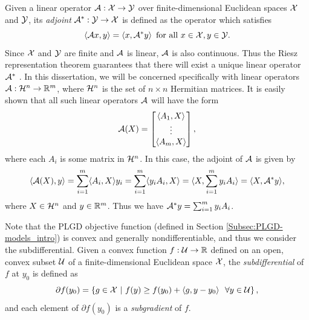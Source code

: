 Given a linear operator ${\mathcal A} : {\mathcal X} \rightarrow {\mathcal Y}$ over finite-dimensional Euclidean spaces ${\mathcal X}$ and ${\mathcal Y}$, its \textit{adjoint} ${\mathcal A}^* : {\mathcal Y} \rightarrow {\mathcal X}$ is defined as the operator which satisfies 
\begin{equation}			\label{Def:adjoint_operator}
\langle {\mathcal A} x, y \rangle = \langle x, {\mathcal A}^* y \rangle \hspace{5pt} \text{for all } x \in {\mathcal X}, y \in {\mathcal Y}. 
\end{equation} 
Since ${\mathcal X}$ and ${\mathcal Y}$ are finite and ${\mathcal A}$ is linear, ${\mathcal A}$ is also continuous.  Thus the Riesz representation theorem guarantees that there will exist a unique linear operator ${\mathcal A}^*$ \cite[Section 6.2]{reed1980functional}.  
In this dissertation, we will be concerned specifically with linear operators ${\mathcal A}: {\mathcal H}^n \rightarrow {\mathbb R}^m$, where ${\mathcal H}^n$ is the set of $n \times n$ Hermitian matrices.  It is easily shown that all such linear operators ${\mathcal A}$ will have the form
\begin{equation}
{\mathcal A}(X) = \begin{bmatrix}
\langle A_1, X \rangle	\\
\vdots	\\
\langle A_m, X \rangle
\end{bmatrix},
\end{equation}
where each $A_i$ is some matrix in ${\mathcal H}^n$.  In this case, the adjoint of ${\mathcal A}$ is given by 
\begin{equation}
\langle {\mathcal A}(X), y \rangle  	= \sum_{i=1}^m \langle A_i, X \rangle y_i	  = \sum_{i=1}^m \langle y_iA_i, X \rangle   = \langle X, \sum_{i=1}^m  y_iA_i \rangle = \langle X, {\mathcal A}^*y \rangle,
\end{equation}
where $X \in {\mathcal H}^n$ and $y \in {\mathbb R}^m$.
Thus we have ${\mathcal A}^*y = \sum_{i=1}^m  y_iA_i$.


Note that the PLGD objective function (defined in Section \ref{Subsec:PLGD-models_intro}) is convex and generally nondifferentiable, and thus we consider the subdifferential.  
Given a convex function $f : {\mathcal U} \rightarrow {\mathbb R}$ defined on an open, convex subset ${\mathcal U}$ of a finite-dimensional Euclidean space ${\mathcal X}$, the \textit{subdifferential} of $f$ at $y_0$ is defined as
\begin{equation}
	\label{Def:subdifferential}
	\partial f(y_0) = \left\{  g \in {\mathcal X} \ | \ f(y) \geq f(y_0) + \langle g, y - y_0 \rangle \ \ \forall y \in {\mathcal U}	\right\},
\end{equation}
and each element of $\partial f(y_0)$ is a \textit{subgradient} of $f$.






